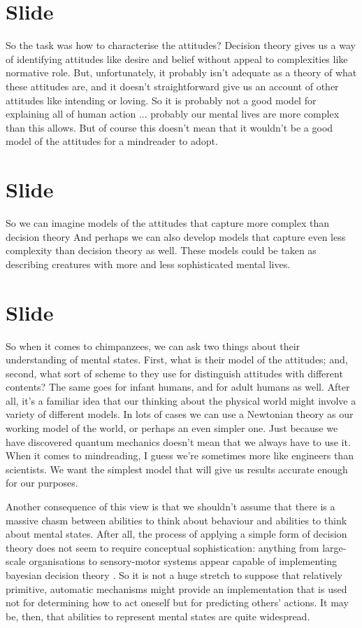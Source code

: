 \documentclass[12pt,\papersize]{extarticle}
\begin{document}
\section{Slide}
So the task was how to characterise the attitudes? 
Decision theory gives us a way of identifying attitudes like desire and belief without appeal to complexities like normative role.
But, unfortunately, it probably isn’t adequate as a theory of what these attitudes are, and it doesn’t straightforward give us an account of other attitudes like intending or loving.
So it is probably not a good model for explaining all of human action ... probably our mental lives are more complex than this allows.
But of course this doesn’t mean that it wouldn’t be a good model of the attitudes for a mindreader to adopt.



\section{Slide}
So we can imagine models of the attitudes that capture more complex than decision theory
And perhaps we can also develop models that capture even less complexity than decision theory as well.
These models could be taken as describing creatures with more and less sophisticated mental lives.

\section{Slide}
So when it comes to chimpanzees, we can ask two things about their understanding of mental states.  First, what is their model of the attitudes; and, second, what sort of scheme to they use for distinguish attitudes with different contents?  
The same goes for infant humans, and for adult humans as well.
After all, it’s a familiar idea that our thinking about the physical world might involve a variety of different models.
In lots of cases we can use a Newtonian theory as our working model of the world, or perhaps an even simpler one.
Just because we have discovered quantum mechanics doesn’t mean that we always have to use it.
When it comes to mindreading, I guess we’re sometimes more like engineers than scientists.
We want the simplest model that will give us results accurate enough for our purposes.

Another consequence of this view is that we shouldn’t assume that there is a massive chasm between abilities to think about behaviour and abilities to think about mental states.
After all, the process of applying a simple form of decision theory does not seem to require conceptual sophistication: anything from large-scale organisations to sensory-motor systems appear capable of implementing bayesian decision theory \citep{kording:2006_bayesian}.  So it is not a huge stretch to suppose that relatively primitive, automatic mechanisms might provide an implementation that is used not for determining how to act oneself but for predicting others’ actions.
It may be, then, that abilities to represent mental states are quite widespread.
\end{document}
